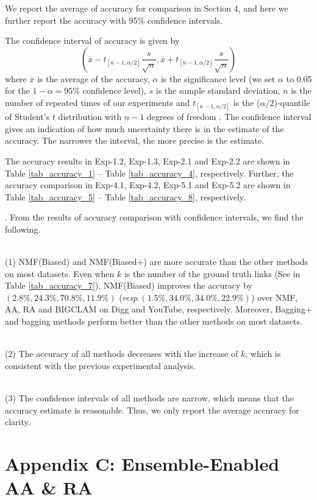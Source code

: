 \documentclass[10pt,journal,compsoc]{IEEEtran}
\newcommand{\stitle}[1]{\vspace{0.5ex}\noindent{\bf #1}}
\newcommand{\NMF}{{\sf NMF}\xspace }
\newcommand{\Biased}{{\sf NMF(Biased)}\xspace}
\newcommand{\Aa}{{\sf AA}\xspace }
\newcommand{\RA}{{\sf RA}\xspace }
\newcommand{\BIGCLAM}{{\sf BIGCLAM}\xspace}
\newcommand{\Digg}{{\sf Digg}\xspace}
\newcommand{\YouTube}{{\sf YouTube}\xspace}
\newcommand{\Biasedp}{{\sf NMF(Biased+)}\xspace}
\newcommand{\resp}{\emph{resp.}\xspace}
\newcommand{\sstab}{\rule{0pt}{8pt}\\[-2.4ex]}
\begin{document}
We report the average of accuracy for comparison in Section 4, and here
we further report the accuracy with 95\% confidence
intervals.

The confidence interval of accuracy is given by
\[ (\overline{x} - t_{[n-1,\alpha/2]}\frac{s}{\sqrt{n}}, \overline{x} + t_{[n-1,\alpha/2]}\frac{s}{\sqrt{n}})  \]
where $\overline{x}$ is the average of the accuracy, $\alpha$ is the significance level
(we set $\alpha$ to 0.05 for the $1 - \alpha = 95\%$ confidence level),
$s$ is the sample standard deviation, $n$ is the number of repeated
times of our experiments and $t_{[n-1,\alpha/2]}$ is the ($\alpha/2$)-quantile
of Student's $t$ distribution with $n - 1$ degrees of freedom \cite{stati}.
The confidence interval gives an indication of how much uncertainty there is in
the estimate of the accuracy. The narrower the interval, the more precise is the estimate.

The accuracy results in Exp-1.2, Exp-1.3, Exp-2.1 and Exp-2.2 are shown in
Table \ref{tab_accuracy_1} -- Table \ref{tab_accuracy_4}, respectively.
Further, the accuracy comparison in Exp-4.1, Exp-4.2, Exp-5.1 and Exp-5.2 are shown in
Table \ref{tab_accuracy_5} -- Table \ref{tab_accuracy_8}, respectively.


\stitle{Remarks}. From the results of accuracy comparison with confidence intervals,
we find the following.

\sstab (1) \Biased and \Biasedp are more accurate than the other methods
on most datasets. Even when $k$ is the number of the ground truth links (See in Table \ref{tab_accuracy_7}), \Biased improves
the accuracy by $(2.8\%, 24.3\%, 70.8\%, 11.9\%)$ (\resp $(1.5\%, 34.0\%, 34.0\%, 22.9\%)$)
over \NMF, \Aa, \RA and \BIGCLAM on \Digg and \YouTube, respectively.
Moreover, Bagging+ and bagging methods perform better than the other methods on most datasets.

\sstab (2) The accuracy of all methods decreases with the increase of $k$,
which is consistent with the previous experimental analysis.

\sstab (3) The confidence intervals of all methods are narrow, which means that the accuracy estimate is reasonable.
Thus, we only report the average accuracy for clarity.






\section{Appendix C: Ensemble-Enabled AA \& RA}
\end{document}

